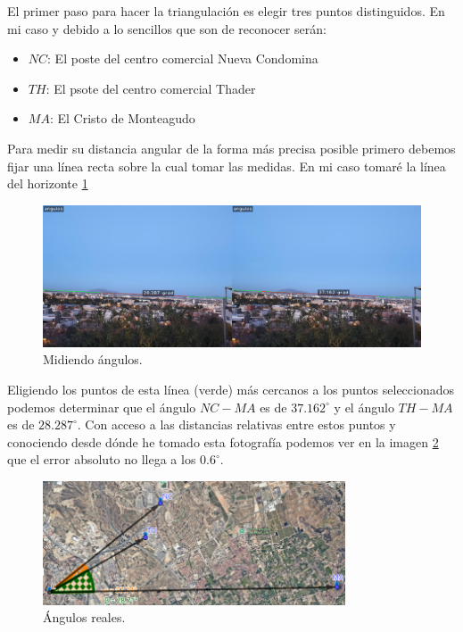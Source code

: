 \documentclass[12pt]{article}
\begin{document}
El primer paso para hacer la triangulación es elegir tres puntos distinguidos. En mi caso y debido a lo sencillos que son de reconocer serán:
\begin{itemize}
    \item[] $NC$: El poste del centro comercial Nueva Condomina
    \item[] $TH$: El psote del centro comercial Thader
    \item[] $MA$: El Cristo de Monteagudo
\end{itemize}
Para medir su distancia angular de la forma más precisa posible primero debemos fijar una línea recta sobre la cual tomar las medidas. En mi caso tomaré la línea del horizonte \ref{fig:paisaje_angulos}
\begin{figure}[H]
    \centering
    \includegraphics[width=1\textwidth]{images_calibracion/Paisaje_angulos.png} 
    \caption{Midiendo ángulos.}
    \label{fig:paisaje_angulos}
\end{figure}
Eligiendo los puntos de esta línea (verde) más cercanos a los puntos seleccionados podemos determinar que el ángulo $NC-MA$ es de $37.162^{\circ}$ y el ángulo $TH-MA$ es de $28.287^{\circ}$. Con acceso a las distancias relativas entre estos puntos y conociendo desde dónde he tomado esta fotografía podemos ver en la imagen \ref{fig:geogebra_angulos} que el error absoluto no llega a los $0.6^{\circ}$. 
\begin{figure}[H]
    \centering
    \includegraphics[width=0.8\textwidth]{images_calibracion/Angulos_Geogebra.png} 
    \caption{Ángulos reales.}
    \label{fig:geogebra_angulos}
\end{figure}
\end{document}
